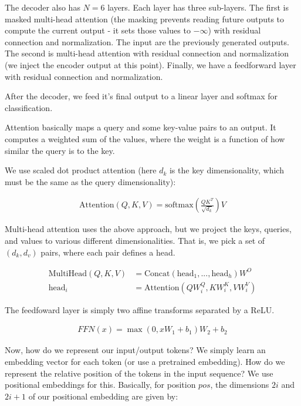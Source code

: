 \documentclass[a4paper]{article}
\begin{document}
The decoder also has $N = 6$ layers. Each layer has three sub-layers. The
first is masked multi-head attention (the masking prevents reading future
outputs to compute the current output - it sets those values to $-\infty$)
with residual connection and
normalization. The input are the previously generated outputs.
The second is multi-head attention with residual connection and normalization
(we inject the encoder output at this point). Finally, we have a feedforward
layer with residual connection and normalization.

After the decoder, we feed it's final output to a linear layer and softmax
for classification.

Attention basically maps a query and some key-value pairs to an output. It
computes a weighted sum of the values, where the weight is a function of how
similar the query is to the key.

We use scaled dot product attention (here $d_k$ is the key dimensionality,
which must be the same as the query dimensionality):

\begin{align}
  \textrm{Attention}(Q, K, V) = \textrm{softmax}(\frac{QK^T}{\sqrt{d_k}}) V
\end{align}

Multi-head attention uses the above approach, but we project the keys, queries,
and values to various different dimensionalities. That is, we pick a set of
$(d_k, d_v)$ pairs, where each pair defines a head.

\begin{align}
  \textrm{MultiHead}(Q, K, V) &= \textrm{Concat}(\textrm{head}_1, ..., \textrm{head}_h) W^O \\
  \textrm{head}_i &= \textrm{Attention}(Q W_i^Q, K W_i^K, V W_i^V)
\end{align}

The feedfoward layer is simply two affine transforms separated by a ReLU.

\begin{align}
  FFN(x) = \max{(0, x W_1 + b_1)} W_2 + b_2
\end{align}

Now, how do we represent our input/output tokens? We simply learn an embedding
vector for each token (or use a pretrained embedding). How do we represent the
relative position of the tokens in the input sequence? We use positional
embeddings for this. Basically, for position $pos$, the dimensions $2i$ and
$2i+1$ of our positional embedding are given by:
\end{document}
